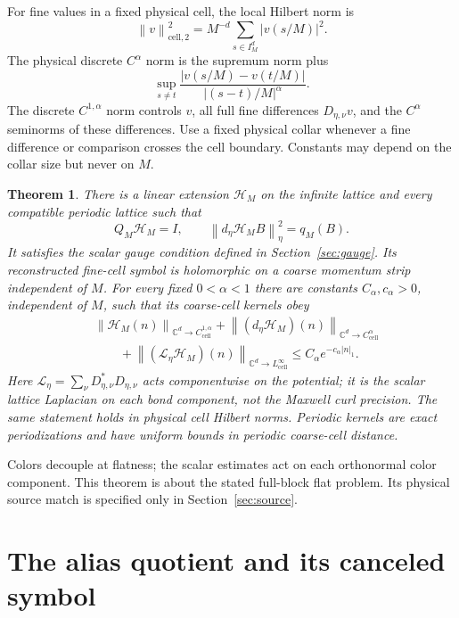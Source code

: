 \documentclass[11pt]{article}
\newtheorem{theorem}{Theorem}[section]
\theoremstyle{remark}
\newcommand{\C}{\mathbb C}
\newcommand{\norm}[1]{\left\|#1\right\|}
\newcommand{\HH}{\mathcal H}
\begin{document}
For fine values in a fixed physical cell, the local Hilbert norm is
\[
 \norm v_{\mathrm{cell},2}^2
       =M^{-d}\sum_{s\in I_M^d}|v(s/M)|^2.
\]
The physical discrete $C^\alpha$ norm is the supremum norm plus
\[
 \sup_{s\ne t}
 \frac{|v(s/M)-v(t/M)|}{|(s-t)/M|^\alpha}.
\]
The discrete $C^{1,\alpha}$ norm controls $v$, all full fine
differences $D_{\eta,\nu}v$, and the $C^\alpha$ seminorms of
these differences. Use a fixed physical collar whenever a fine
difference or comparison crosses the cell boundary. Constants may
depend on the collar size but never on $M$.

\begin{theorem}\label{thm:extension}
There is a linear extension $\HH_M$ on the infinite lattice and
every compatible periodic lattice such that
\[
 Q_M\HH_M=I,\qquad
 \norm{d_\eta\HH_M B}_\eta^2=q_M(B).
\]
It satisfies the scalar gauge condition defined in Section~\ref{sec:gauge}.
Its reconstructed fine-cell symbol is holomorphic on a coarse
momentum strip independent of $M$. For every fixed $0<\alpha<1$
there are constants $C_\alpha,c_\alpha>0$, independent of $M$,
such that its coarse-cell kernels obey
\begin{equation}\label{eq:locality}
 \begin{split}
 &\norm{\HH_M(n)}_{\C^d\to C^{1,\alpha}_{\mathrm{cell}}}
 +\norm{(d_\eta\HH_M)(n)}_{\C^d\to C^\alpha_{\mathrm{cell}}}\\
 &\qquad+\norm{(\mathcal L_\eta\HH_M)(n)}_{\C^d\to L^\infty_{\mathrm{cell}}}
 \le C_\alpha e^{-c_\alpha|n|_1}.
 \end{split}
\end{equation}
Here $\mathcal L_\eta=\sum_\nu D_{\eta,\nu}^*D_{\eta,\nu}$
acts componentwise on the potential; it is the scalar lattice
Laplacian on each bond component, not the Maxwell curl precision.
The same statement holds in physical cell Hilbert norms.
Periodic kernels are exact periodizations and have uniform bounds
in periodic coarse-cell distance.
\end{theorem}

Colors decouple at flatness; the scalar estimates act on each
orthonormal color component. This theorem is about the stated
full-block flat problem. Its physical source match is specified
only in Section~\ref{sec:source}.

\section{The alias quotient and its canceled symbol}
\end{document}
